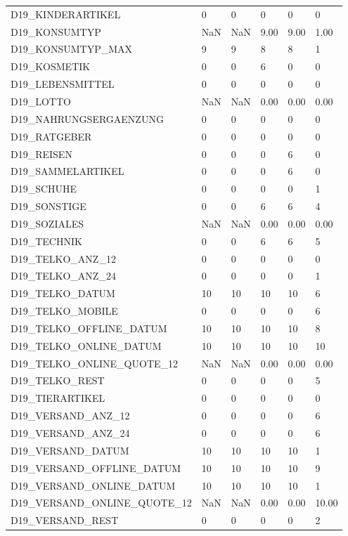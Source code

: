 \begin{longtable}{lp{1cm}p{1cm}p{1cm}p{1cm}p{1cm}}
D19\_KINDERARTIKEL  & 0 & 0 & 0 & 0 & 0 \\
D19\_KONSUMTYP    & NaN & NaN & 9.00 & 9.00 & 1.00 \\
D19\_KONSUMTYP\_MAX  & 9 & 9 & 8 & 8 & 1 \\
D19\_KOSMETIK  & 0 & 0 & 6 & 0 & 0 \\
D19\_LEBENSMITTEL   & 0 & 0 & 0 & 0 & 0 \\
D19\_LOTTO & NaN & NaN & 0.00 & 0.00 & 0.00 \\
D19\_NAHRUNGSERGAENZUNG  & 0 & 0 & 0 & 0 & 0 \\
D19\_RATGEBER  & 0 & 0 & 0 & 0 & 0 \\
D19\_REISEN & 0 & 0 & 0 & 6 & 0 \\
D19\_SAMMELARTIKEL  & 0 & 0 & 0 & 6 & 0 \\
D19\_SCHUHE & 0 & 0 & 0 & 0 & 1 \\
D19\_SONSTIGE  & 0 & 0 & 6 & 6 & 4 \\
D19\_SOZIALES  & NaN & NaN & 0.00 & 0.00 & 0.00 \\
D19\_TECHNIK & 0 & 0 & 6 & 6 & 5 \\
D19\_TELKO\_ANZ\_12   & 0 & 0 & 0 & 0 & 0 \\
D19\_TELKO\_ANZ\_24   & 0 & 0 & 0 & 0 & 1 \\
D19\_TELKO\_DATUM  &  10 & 10 & 10 & 10 & 6 \\
D19\_TELKO\_MOBILE   & 0 & 0 & 0 & 0 & 6 \\
D19\_TELKO\_OFFLINE\_DATUM   &  10 & 10 & 10 & 10 & 8 \\
D19\_TELKO\_ONLINE\_DATUM  &  10 & 10 & 10 & 10 & 10 \\
D19\_TELKO\_ONLINE\_QUOTE\_12 & NaN & NaN & 0.00 & 0.00 & 0.00 \\
D19\_TELKO\_REST   & 0 & 0 & 0 & 0 & 5 \\
D19\_TIERARTIKEL  & 0 & 0 & 0 & 0 & 0 \\
D19\_VERSAND\_ANZ\_12 & 0 & 0 & 0 & 0 & 6 \\
D19\_VERSAND\_ANZ\_24 & 0 & 0 & 0 & 0 & 6 \\
D19\_VERSAND\_DATUM  &  10 & 10 & 10 & 10 & 1 \\
D19\_VERSAND\_OFFLINE\_DATUM &  10 & 10 & 10 & 10 & 9 \\
D19\_VERSAND\_ONLINE\_DATUM  &  10 & 10 & 10 & 10 & 1 \\
D19\_VERSAND\_ONLINE\_QUOTE\_12 & NaN & NaN & 0.00 & 0.00 &  10.00 \\
D19\_VERSAND\_REST   & 0 & 0 & 0 & 0 & 2 \\

\end{longtable}
